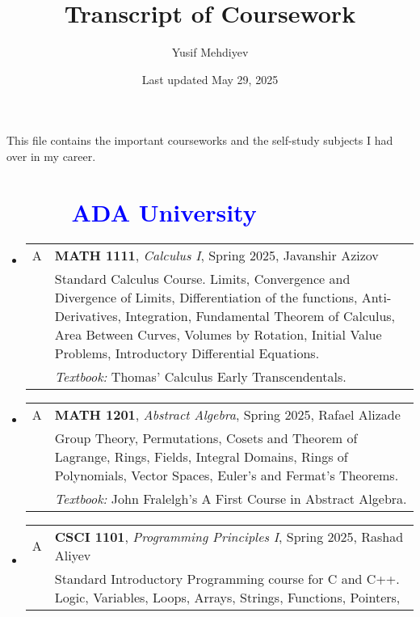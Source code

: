 \documentclass[12pt]{article}
\title{Transcript of Coursework}
\author{Yusif Mehdiyev}
\date{Last updated May 29, 2025}
\begin{document}
\maketitle

This file contains the important courseworks and the self-study subjects  I had over in my career.
\renewcommand{\contentsname}{Contents:} %
\tableofcontents

\section*{\textcolor{blue}{\ \ \ \ \  ADA University}}
\begin{itemize}[leftmargin = *]
    \item[]
        \begin{tabularx}{\textwidth}{@{}lX@{}}
            A & \textbf{MATH 1111}, \textit{Calculus I}, Spring 2025, Javanshir Azizov
            \\
            & Standard Calculus Course. Limits, Convergence and Divergence of Limits, Differentiation of the functions, Anti-Derivatives,
            Integration, Fundamental Theorem of Calculus, Area Between Curves, Volumes by Rotation, Initial Value Problems, Introductory
            Differential Equations.
            \\
            & \textit{Textbook:} Thomas’ Calculus Early Transcendentals.
        \end{tabularx}
    \item[]
        \begin{tabularx}{\textwidth}{@{}lX@{}}
            A & \textbf{MATH 1201}, \textit{Abstract Algebra}, Spring 2025, Rafael Alizade
            \\
            & Group Theory, Permutations, Cosets and Theorem of Lagrange, Rings, Fields, Integral Domains, Rings of Polynomials, Vector
            Spaces, Euler's and Fermat's Theorems.
            \\
            & \textit{Textbook:} John Fralelgh's A First Course in Abstract Algebra.
        \end{tabularx}
    \item[]
        \begin{tabularx}{\textwidth}{@{}lX@{}}
            A & \textbf{CSCI 1101}, \textit{Programming Principles I}, Spring 2025, Rashad Aliyev
            \\
            & Standard Introductory Programming course for C and C++. Logic, Variables, Loops, Arrays, Strings, Functions, Pointers,

\end{tabularx}
\end{itemize}
\end{document}
